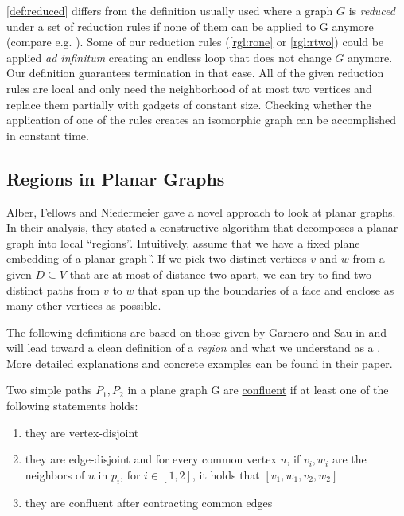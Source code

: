 \cref{def:reduced} differs from the definition usually used where a graph $G$ is \textit{reduced} under a set of reduction rules if none of them can be applied to G anymore (compare e.g. \cite{Fomin2019}). Some of our reduction rules (\cref{rgl:rone} or \cref{rgl:rtwo}) could be applied \textit{ad infinitum} creating an endless loop that does not change $G$ anymore. Our definition guarantees termination in that case. All of the given reduction rules are local and only need the neighborhood of at most two vertices and replace them partially with gadgets of constant size. Checking whether the application of one of the rules creates an isomorphic graph can be accomplished in constant time.

\subsection{Regions in Planar Graphs}

Alber, Fellows and Niedermeier \cite{Alber2004} gave a novel approach to look at planar graphs. In their analysis, they stated a constructive algorithm that decomposes a planar graph into local ``regions''. Intuitively, assume that we have a fixed plane embedding of a planar graph \G. If we pick two distinct vertices $v$ and $w$ from a given \sdom $D \subseteq V$ that are at most of distance two apart, we can try to find two distinct paths from $v$ to $w$ that span up the boundaries of a face and enclose as many other vertices as possible. 

The following definitions are based on those given by Garnero and Sau in \cite[arXiv v2]{Garnero2018} and will lead toward a clean definition of a \textit{region} and what we understand as a \dreg. More detailed explanations and concrete examples can be found in their paper.

\begin{definition}
    Two simple paths $P_1, P_2$ in a plane graph G are \underline{confluent} if at least one of the following statements holds:
    
    \begin{enumerate}
        \item they are vertex-disjoint
        \item they are edge-disjoint and for every common vertex $u$, if $v_i, w_i$ are the neighbors of $u$ in $p_i$, for $i \in [1,2]$, it holds that $[v_1, w_1, v_2, w_2]$
        \item they are confluent after contracting common edges
    \end{enumerate}
\end{definition}

